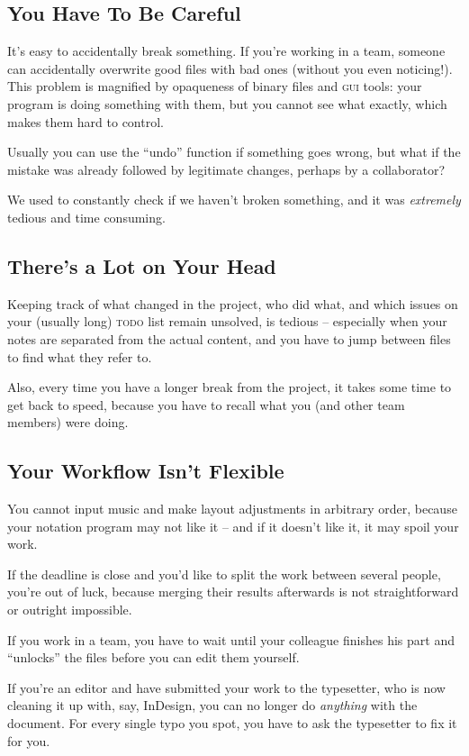 \documentclass[11pt,a4paper]{article}
\begin{document}
\subsection{You Have To Be Careful}
It's easy to accidentally break something. If you're working in a team,
someone can accidentally overwrite good files with bad ones (without you even noticing!).
This problem is magnified by opaqueness of binary files and \textsc{gui}
tools: your program is doing something with them, but you cannot see what exactly,
which makes them hard to control.

Usually you can use the “undo” function if something goes wrong,
but what if the mistake was already followed by legitimate changes, perhaps
by a collaborator?

We used to constantly check if we haven't broken something,
and it was \emph{extremely} tedious and time consuming.

\subsection{There's a Lot on Your Head}
Keeping track of what changed in the project, who did what,
and which issues on your (usually long) \textsc{todo} list remain
unsolved, is tedious -- especially when your notes are separated from
the actual content, and you have to jump between files to find
what they refer to.

Also, every time you have a longer break from the project, it takes some
time to get back to speed, because you have to recall what you
(and other team members) were doing.

\subsection{Your Workflow Isn't Flexible}
You cannot input music and make layout adjustments in arbitrary order, because
your notation program may not like it -- and if it doesn't like it,
it may spoil your work.

If the deadline is close and you'd like to split the work between several people,
you're out of luck, because merging their results afterwards is not straightforward
or outright impossible.

If you work in a team, you have to wait until your colleague finishes his part
and “unlocks” the files before you can edit them yourself.

If you're an editor and have submitted your work to the typesetter, who is now cleaning it up with, say, InDesign, you can no longer do \emph{anything} with
the document.  For every single typo you spot, you have to ask the typesetter to fix it
for you.
\end{document}
